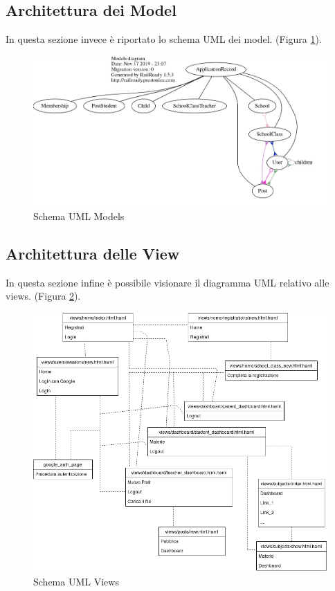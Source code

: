 \documentclass[Lau, binding=0.6cm, oneside]{sapthesis}
\begin{document}
\subsection{Architettura dei Model}

In questa sezione invece è riportato lo schema UML dei model. (Figura \ref{fig:schema_UML_models}).\\

\begin{figure}[H]
	\centering
	\includegraphics[width=1\linewidth]{images/models_UML} 
	\caption{Schema UML Models}
	\label{fig:schema_UML_models}
\end{figure}

\subsection{Architettura delle View}

In questa sezione infine è possibile visionare il diagramma UML relativo alle views. (Figura \ref{fig:UML_views}).

\begin{figure}[H]
	\centering
	\includegraphics[width=1\linewidth]{images/UML_views} 
	\caption{Schema UML Views}
	\label{fig:UML_views}
\end{figure}
\end{document}
